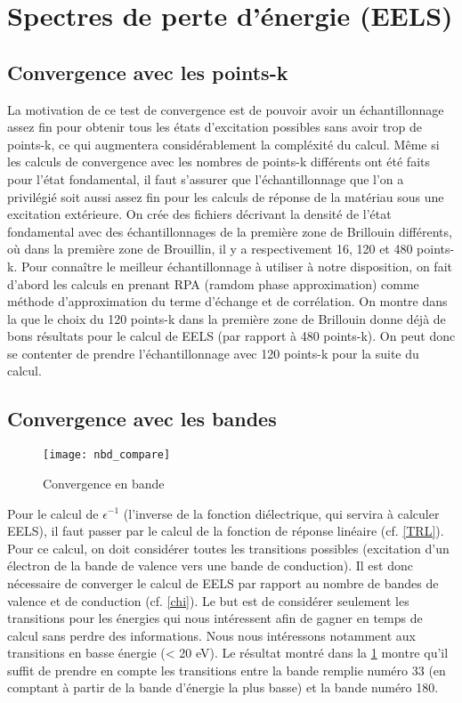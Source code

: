 \section{Spectres de perte d'énergie (EELS)}
\subsection{Convergence avec les points-k}
La motivation de ce test de convergence est de pouvoir avoir un échantillonnage assez fin pour obtenir tous les états d'excitation possibles sans avoir trop de points-k, ce qui augmentera considérablement la compléxité du calcul.
Même si les calculs de convergence avec les nombres de points-k différents ont été faits pour l'état fondamental, il faut s'assurer que l'échantillonnage que l'on a privilégié soit aussi assez fin pour les calculs de réponse de la matériau sous une excitation extérieure.
On crée des fichiers décrivant la densité de l'état fondamental avec des échantillonnages de la première zone de Brillouin différents, où dans la première zone de Brouillin, il y a respectivement 16, 120 et 480 points-k.
Pour connaître le meilleur échantillonnage à utiliser à notre disposition, on fait d'abord les calculs en prenant RPA (ramdom phase approximation) comme méthode d'approximation du terme d'échange et de corrélation.
On montre dans la
que le choix du 120 points-k dans la première zone de Brillouin donne déjà de bons résultats pour le calcul de EELS (par rapport à 480 points-k). On peut donc se contenter de prendre l'échantillonnage avec 120 points-k pour la suite du calcul.

\subsection{Convergence avec les bandes}

\begin{figure}[!h]\label{cv_nbd}
    \centering
    \texttt{[image: nbd\_compare]}
    \caption{Convergence en bande}
\end{figure}

Pour le calcul de $\epsilon^{-1}$ (l'inverse de la fonction diélectrique, qui servira à calculer EELS), il faut passer par le calcul de la fonction de réponse linéaire (cf. \cref{TRL}).
Pour ce calcul, on doit considérer toutes les transitions possibles (excitation d'un électron de la bande de valence vers une bande de conduction).
Il est donc nécessaire de converger le calcul de EELS par rapport au nombre de bandes de valence et de conduction (cf. \cref{chi}).
Le but est de considérer seulement les transitions pour les énergies qui nous intéressent afin de gagner en temps de calcul sans perdre des informations.
Nous nous intéressons notamment aux transitions en basse énergie (< 20 eV).
Le résultat montré dans la \cref{cv_nbd} montre qu'il suffit de prendre en compte les transitions entre la bande remplie numéro 33 (en comptant à partir de la bande d'énergie la plus basse) et la bande numéro 180.

